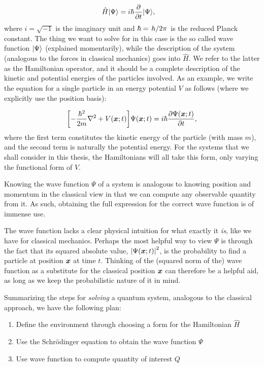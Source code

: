 \documentclass[Thesis.tex]{subfiles}
\begin{document}
\begin{align}
    \hat H| \Psi \rangle &= i\hbar \pdv{}{t}| \Psi \rangle,\label{eq:schrodinger-time-dependent-general}
\end{align}
%
where $i=\sqrt{-1}$ is the imaginary unit and $\hbar=\flatfrac{h}{2\pi}$ is the reduced Planck constant.
The thing we want to solve for in this case is the so called wave function $| \Psi \rangle$
(explained momentarily), while the description of the system (analogous to the forces in
classical mechanics) goes into $\hat H$. We refer to the latter as the Hamiltonian
operator, and it should be a complete description of the kinetic and potential energies of
the particles involved. As an example, we write the equation for a single particle in an energy
potential $V$ as follows (where we explicitly use the position basis):

\begin{align}
    \qty[-\frac{\hbar^2}{2m} \laplacian + V(\vb x; t)]\Psi(\vb x;t) =
    i\hbar\pdv{\Psi(\vb x; t)}{t},\label{eq:schrodinger-time-dependent-position-basis}
\end{align}
%
where the first term constitutes the kinetic energy of the particle (with mass $m$), and the second term is
naturally the potential energy. For the systems that we shall consider in this thesis, the
Hamiltonians will all take this form, only varying the functional form of $V$.

Knowing the wave function $\Psi$ of a system is analogous to knowing position and momentum
in the classical view in that we can compute any observable quantity from it. As such,
obtaining the full expression for the correct wave function is of immense use.

The wave function lacks a clear physical intuition for what exactly it \emph{is},
like we have for classical mechanics. Perhaps the most helpful way to view $\Psi$ is
through the fact that its squared absolute value, $\abs{\Psi(\bm{x}; t)}^2$, is the
probability to find a particle at position $\bm{x}$ at time $t$. Thinking of the (squared
norm of the) wave function as a substitute for the classical position $\bm{x}$ can
therefore be a helpful aid, as long as we keep the probabilistic nature of it in mind.

Summarizing the steps for \emph{solving} a quantum system, analogous to the
classical approach, we have the following plan:
\begin{enumerate}
    \item Define the environment through choosing a form for the Hamiltonian $\hat H$
    \item Use the Schrödinger equation to obtain the wave function $\Psi$
    \item Use wave function to compute quantity of interest $Q$
\end{enumerate}
\end{document}
